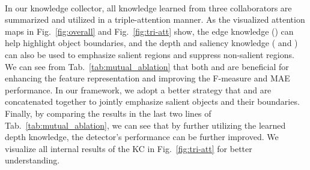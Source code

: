 \documentclass[runningheads]{llncs}
\begin{document}
\\
In our knowledge collector, all knowledge learned from three collaborators are summarized and utilized in a triple-attention manner.
As the visualized attention maps in Fig.~\ref{fig:overall} and Fig.~\ref{fig:tri-att} show, the edge knowledge () can help highlight object boundaries, and the depth and saliency knowledge ( and ) can also be used to emphasize salient regions and suppress non-salient regions.
We can see from Tab.~\ref{tab:mutual_ablation} that both  and  are beneficial for enhancing the feature representation and improving the F-measure and MAE performance.
In our framework, we adopt a better strategy that  and  are concatenated together to jointly emphasize salient objects and their boundaries.
Finally, by comparing the results in the last two lines of Tab.~\ref{tab:mutual_ablation}, we can see that by further utilizing the learned depth knowledge, the detector's performance can be further improved.
We visualize all internal results of the KC in Fig.~\ref{fig:tri-att} for better understanding.
\end{document}
